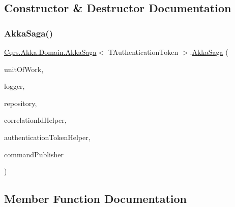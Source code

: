 \subsection{Constructor \& Destructor Documentation}
\mbox{\label{classCqrs_1_1Akka_1_1Domain_1_1AkkaSaga_a2f0ebb5d1d22e3112d5b9a09fde7fb47}} 
\subsubsection{\texorpdfstring{Akka\+Saga()}{AkkaSaga()}}
{\footnotesize\ttfamily \hyperlink{classCqrs_1_1Akka_1_1Domain_1_1AkkaSaga}{Cqrs.\+Akka.\+Domain.\+Akka\+Saga}$<$ T\+Authentication\+Token $>$.\hyperlink{classCqrs_1_1Akka_1_1Domain_1_1AkkaSaga}{Akka\+Saga} (\begin{DoxyParamCaption}\item[{\hyperlink{interfaceCqrs_1_1Domain_1_1ISagaUnitOfWork}{I\+Saga\+Unit\+Of\+Work}$<$ T\+Authentication\+Token $>$}]{unit\+Of\+Work,  }\item[{I\+Logger}]{logger,  }\item[{\hyperlink{interfaceCqrs_1_1Akka_1_1Domain_1_1IAkkaSagaRepository}{I\+Akka\+Saga\+Repository}$<$ T\+Authentication\+Token $>$}]{repository,  }\item[{I\+Correlation\+Id\+Helper}]{correlation\+Id\+Helper,  }\item[{\hyperlink{interfaceCqrs_1_1Authentication_1_1IAuthenticationTokenHelper}{I\+Authentication\+Token\+Helper}$<$ T\+Authentication\+Token $>$}]{authentication\+Token\+Helper,  }\item[{\hyperlink{interfaceCqrs_1_1Commands_1_1ICommandPublisher}{I\+Command\+Publisher}$<$ T\+Authentication\+Token $>$}]{command\+Publisher }\end{DoxyParamCaption})\hspace{0.3cm}{\ttfamily [protected]}}



\subsection{Member Function Documentation}
\mbox{\label{classCqrs_1_1Akka_1_1Domain_1_1AkkaSaga_a4a12310825f2d2cc5963eee4cc4ed802}} 
